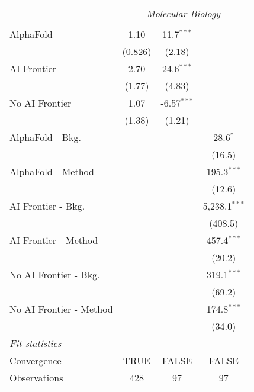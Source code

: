 \begin{tabular}{lccc}
 & \multicolumn{3}{c}{\textit{Molecular Biology}} \\ \\
   AlphaFold               & 1.10    & 11.7$^{***}$  &   \\   
                           & (0.826) & (2.18)        &   \\   
   AI Frontier             & 2.70    & 24.6$^{***}$  &   \\   
                           & (1.77)  & (4.83)        &   \\   
   No AI Frontier          & 1.07    & -6.57$^{***}$ &   \\   
                           & (1.38)  & (1.21)        &   \\   
   AlphaFold - Bkg.        &         &               & 28.6$^{*}$\\   
                           &         &               & (16.5)\\   
   AlphaFold - Method      &         &               & 195.3$^{***}$\\   
                           &         &               & (12.6)\\   
   AI Frontier - Bkg.      &         &               & 5,238.1$^{***}$\\   
                           &         &               & (408.5)\\   
   AI Frontier - Method    &         &               & 457.4$^{***}$\\   
                           &         &               & (20.2)\\   
   No AI Frontier - Bkg.   &         &               & 319.1$^{***}$\\   
                           &         &               & (69.2)\\   
   No AI Frontier - Method &         &               & 174.8$^{***}$\\   
                           &         &               & (34.0)\\   
   \midrule
   \emph{Fit statistics}\\
   Convergence             &TRUE     & FALSE         & FALSE\\  
   Observations            & 428     & 97            & 97\\  
   

\end{tabular}
